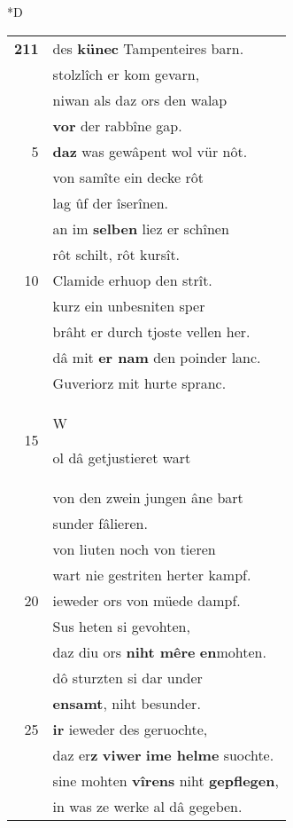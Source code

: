 \documentclass[8pt,a4paper,notitlepage]{article}
\begin{document}
\begin{table}[ht]
\begin{minipage}[t]{0.5\linewidth}
\small
\begin{center}*D
\end{center}
\begin{tabular}{rl}
\textbf{211} & des \textbf{künec} Tampenteires barn.\\ 
 & stolzlîch er kom gevarn,\\ 
 & niwan als daz ors den walap\\ 
 & \textbf{vor} der rabbîne gap.\\ 
5 & \textbf{daz} was gewâpent wol vür nôt.\\ 
 & von samîte ein decke rôt\\ 
 & lag ûf der îserînen.\\ 
 & an im \textbf{selben} liez er schînen\\ 
 & rôt schilt, rôt kursît.\\ 
10 & Clamide erhuop den strît.\\ 
 & kurz ein unbesniten sper\\ 
 & brâht er durch tjoste vellen her.\\ 
 & dâ mit \textbf{er nam} den poinder lanc.\\ 
 & Guveriorz mit hurte spranc.\\ 
15 & \begin{large}W\end{large}ol dâ getjustieret wart\\ 
 & von den zwein jungen âne bart\\ 
 & sunder fâlieren.\\ 
 & von liuten noch von tieren\\ 
 & wart nie gestriten herter kampf.\\ 
20 & ieweder ors von müede dampf.\\ 
 & Sus heten si gevohten,\\ 
 & daz diu ors \textbf{niht mêre} \textbf{en}mohten.\\ 
 & dô sturzten si dar under\\ 
 & \textbf{ensamt}, niht besunder.\\ 
25 & \textbf{ir} ieweder des geruochte,\\ 
 & daz er\textbf{z} \textbf{viwer} \textbf{ime helme} suochte.\\ 
 & sine mohten \textbf{vîrens} niht \textbf{gepflegen},\\ 
 & in was ze werke al dâ gegeben.\\ 

\end{tabular}
\end{minipage}
\end{table}
\end{document}
